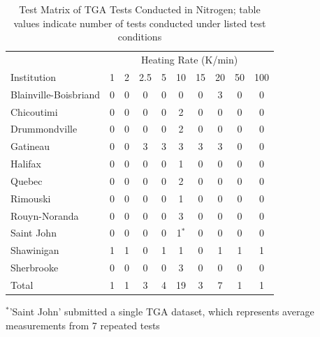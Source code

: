 \documentclass{book}
\begin{document}
\begin{table}[ht]
\caption{Test Matrix of TGA Tests Conducted in Nitrogen; table values indicate number of tests conducted under listed test conditions}
\label{Table:Matrix_TGA_N2}
\begin{center}
\begin{tabular}{lccccccccc}
\hline
                        & \multicolumn{9}{c}{Heating Rate (K/min)}                     \\ %
Institution             & 1     & 2   & 2.5 & 5   & 10    & 15  & 20  & 50  & 100      \\ \hline
Blainville-Boisbriand   &   0   & 0   & 0   & 0   & 0     & 0   & 3   & 0   & 0        \\
Chicoutimi              &   0   & 0   & 0   & 0   & 2     & 0   & 0   & 0   & 0        \\
Drummondville           &   0   & 0   & 0   & 0   & 2     & 0   & 0   & 0   & 0        \\
Gatineau                &   0   & 0   & 3   & 3   & 3     & 3   & 3   & 0   & 0        \\
Halifax                 &   0   & 0   & 0   & 0   & 1     & 0   & 0   & 0   & 0        \\
Quebec                  &   0   & 0   & 0   & 0   & 2     & 0   & 0   & 0   & 0        \\
Rimouski                &   0   & 0   & 0   & 0   & 1     & 0   & 0   & 0   & 0        \\
Rouyn-Noranda           &   0   & 0   & 0   & 0   & 3     & 0   & 0   & 0   & 0        \\
Saint John              &   0   & 0   & 0   & 0   & 1$^*$ & 0   & 0   & 0   & 0        \\
Shawinigan              &   1   & 1   & 0   & 1   & 1     & 0   & 1   & 1   & 1        \\
Sherbrooke              &   0   & 0   & 0   & 0   & 3     & 0   & 0   & 0   & 0        \\ \hline
Total                   &   1   & 1   & 3   & 4   & 19    & 3   & 7   & 1   & 1        \\ \hline
\end{tabular}
\end{center}
$^*$'Saint John' submitted a single TGA dataset, which represents average measurements from 7 repeated tests
\end{table}
\end{document}
